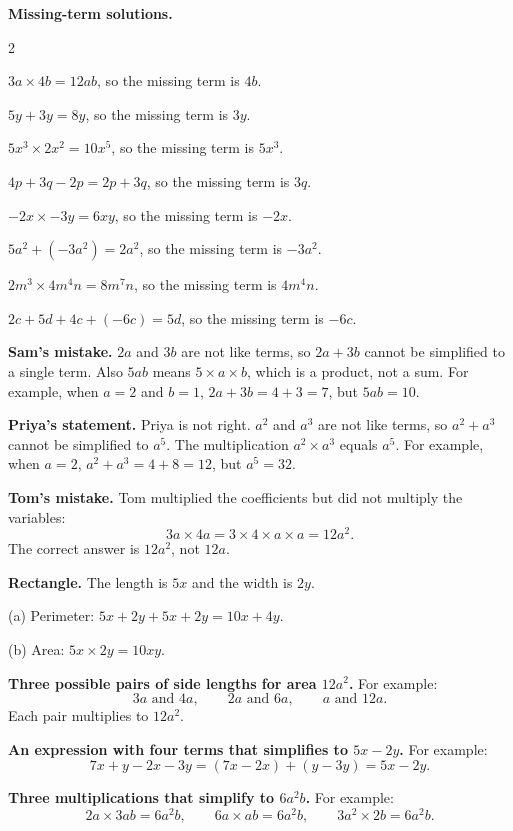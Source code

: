 \documentclass[12pt,a4paper]{article}
\newcommand{\topic}[1]{\vspace{2pt}{\Large\bfseries #1}\par\vspace{4pt}}
\newcommand{\solitem}[1]{\par\noindent #1\par\vspace{2pt}}
\newenvironment{solutions}{\begin{multicols}{2}\raggedright}{\end{multicols}}
\begin{document}
\newpage
\topic{13. Problem solving}

\textbf{Missing-term solutions.}
\begin{solutions}
\solitem{\(3a\times 4b=12ab\), so the missing term is \(4b\).}
\solitem{\(5y+3y=8y\), so the missing term is \(3y\).}
\solitem{\(5x^3\times 2x^2=10x^5\), so the missing term is \(5x^3\).}
\solitem{\(4p+3q-2p=2p+3q\), so the missing term is \(3q\).}
\solitem{\(-2x\times -3y=6xy\), so the missing term is \(-2x\).}
\solitem{\(5a^2+(-3a^2)=2a^2\), so the missing term is \(-3a^2\).}
\solitem{\(2m^3\times 4m^4n=8m^7n\), so the missing term is \(4m^4n\).}
\solitem{\(2c+5d+4c+(-6c)=5d\), so the missing term is \(-6c\).}
\end{solutions}

\vspace{8pt}

\solitem{\textbf{Sam's mistake.} \(2a\) and \(3b\) are not like terms, so
\(2a+3b\) cannot be simplified to a single term. Also \(5ab\) means
\(5\times a\times b\), which is a product, not a sum. For example, when
\(a=2\) and \(b=1\), \(2a+3b=4+3=7\), but \(5ab=10\).}

\vspace{6pt}

\solitem{\textbf{Priya's statement.} Priya is not right. \(a^2\) and \(a^3\)
are not like terms, so \(a^2+a^3\) cannot be simplified to \(a^5\).
The multiplication \(a^2\times a^3\) equals \(a^5\). For example, when
\(a=2\), \(a^2+a^3=4+8=12\), but \(a^5=32\).}

\vspace{6pt}

\solitem{\textbf{Tom's mistake.} Tom multiplied the coefficients but did not
multiply the variables:
\[
  3a\times 4a=3\times 4\times a\times a=12a^2.
\]
The correct answer is \(12a^2\), not \(12a\).}

\vspace{6pt}

\solitem{\textbf{Rectangle.} The length is \(5x\) and the width is \(2y\).}
\solitem{(a) Perimeter: \(5x+2y+5x+2y=10x+4y\).}
\solitem{(b) Area: \(5x\times 2y=10xy\).}

\vspace{6pt}

\solitem{\textbf{Three possible pairs of side lengths for area \(12a^2\).}
For example:
\[
  3a \text{ and } 4a,\qquad 2a \text{ and } 6a,\qquad a \text{ and } 12a.
\]
Each pair multiplies to \(12a^2\).}

\vspace{6pt}

\solitem{\textbf{An expression with four terms that simplifies to \(5x-2y\).}
For example:
\[
  7x+y-2x-3y=(7x-2x)+(y-3y)=5x-2y.
\]}

\vspace{6pt}

\solitem{\textbf{Three multiplications that simplify to \(6a^2b\).}
For example:
\[
  2a\times 3ab=6a^2b,\qquad
  6a\times ab=6a^2b,\qquad
  3a^2\times 2b=6a^2b.
\]}
\end{document}
